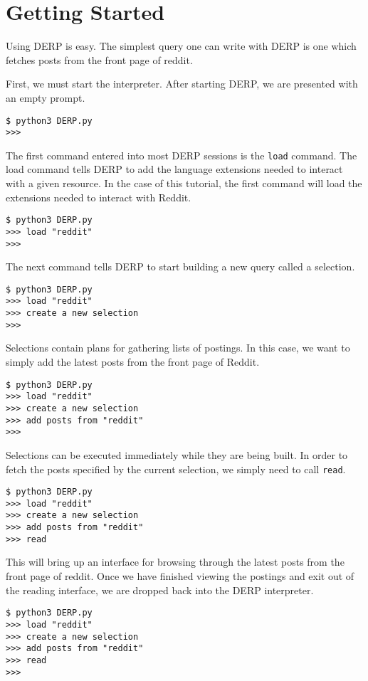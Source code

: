 \section{Getting Started}
Using DERP is easy. The simplest query one can write with DERP is one which fetches posts from the front page of reddit.

First, we must start the interpreter. After starting DERP, we are presented with an empty prompt.
\begin{lstlisting}
$ python3 DERP.py
>>>
\end{lstlisting}



The first command entered into most DERP sessions is the \texttt{load} command. The load command tells DERP to add the language
extensions needed to interact with a given resource. In the case of this tutorial, the first command will load the
extensions needed to interact with Reddit.
\begin{lstlisting}
$ python3 DERP.py
>>> load "reddit"
>>>
\end{lstlisting}



The next command tells DERP to start building a new query called a selection.
\begin{lstlisting}
$ python3 DERP.py
>>> load "reddit"
>>> create a new selection
>>>
\end{lstlisting}



Selections contain plans for gathering lists of postings. In this case, we want to simply add the latest posts from the front page of Reddit.
\begin{lstlisting}
$ python3 DERP.py
>>> load "reddit"
>>> create a new selection
>>> add posts from "reddit"
>>>
\end{lstlisting}



Selections can be executed immediately while they are being built. In order to fetch the posts specified by the current selection, we simply need to call \texttt{read}.
\begin{lstlisting}
$ python3 DERP.py
>>> load "reddit"
>>> create a new selection
>>> add posts from "reddit"
>>> read
\end{lstlisting}



This will bring up an interface for browsing through the latest posts from the front page of reddit. Once we have finished viewing the postings and exit out of the reading interface, we are dropped back into the DERP interpreter.
\begin{lstlisting}
$ python3 DERP.py
>>> load "reddit"
>>> create a new selection
>>> add posts from "reddit"
>>> read
>>>
\end{lstlisting}


